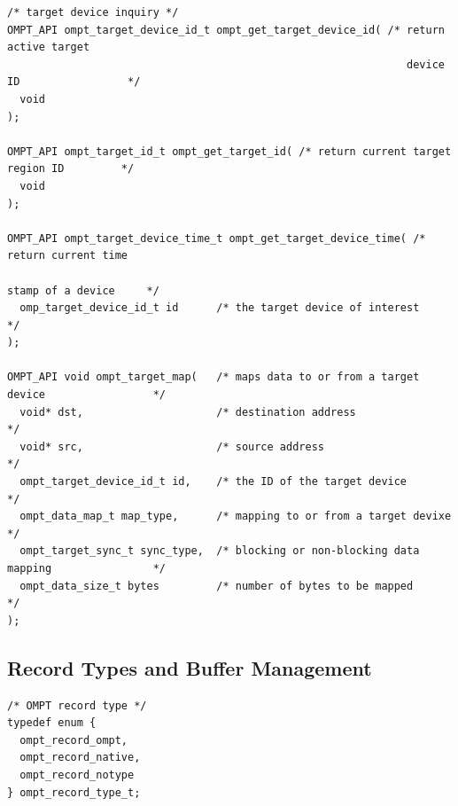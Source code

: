 \documentclass{article}
\begin{document}
\begin{verbatim}
/* target device inquiry */
OMPT_API ompt_target_device_id_t ompt_get_target_device_id( /* return active target
                                                               device ID                 */
  void
);

OMPT_API ompt_target_id_t ompt_get_target_id( /* return current target region ID         */
  void
);

OMPT_API ompt_target_device_time_t ompt_get_target_device_time( /* return current time
                                                                   stamp of a device     */
  omp_target_device_id_t id      /* the target device of interest                        */
);

OMPT_API void ompt_target_map(   /* maps data to or from a target device                 */
  void* dst,                     /* destination address                                  */
  void* src,                     /* source address                                       */
  ompt_target_device_id_t id,    /* the ID of the target device                          */
  ompt_data_map_t map_type,      /* mapping to or from a target devixe                   */
  ompt_target_sync_t sync_type,  /* blocking or non-blocking data mapping                */
  ompt_data_size_t bytes         /* number of bytes to be mapped                         */
);

\end{verbatim}

\clearpage  
\subsection{Record Types and Buffer Management}
\label{appendix:ompt-records}

\begin{verbatim}
/* OMPT record type */
typedef enum {
  ompt_record_ompt,
  ompt_record_native,
  ompt_record_notype
} ompt_record_type_t; 
\end{verbatim}
\end{document}
